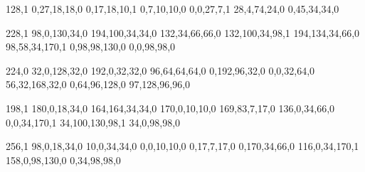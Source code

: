 128,1
0,27,18,18,0
0,17,18,10,1
0,7,10,10,0
0,0,27,7,1
28,4,74,24,0
0,45,34,34,0

228,1
98,0,130,34,0
194,100,34,34,0
132,34,66,66,0
132,100,34,98,1
194,134,34,66,0
98,58,34,170,1
0,98,98,130,0
0,0,98,98,0

224,0
32,0,128,32,0
192,0,32,32,0
96,64,64,64,0
0,192,96,32,0
0,0,32,64,0
56,32,168,32,0
0,64,96,128,0
97,128,96,96,0

198,1
180,0,18,34,0
164,164,34,34,0
170,0,10,10,0
169,83,7,17,0
136,0,34,66,0
0,0,34,170,1
34,100,130,98,1
34,0,98,98,0

256,1
98,0,18,34,0
10,0,34,34,0
0,0,10,10,0
0,17,7,17,0
0,170,34,66,0
116,0,34,170,1
158,0,98,130,0
0,34,98,98,0


\fi











	\newpage

